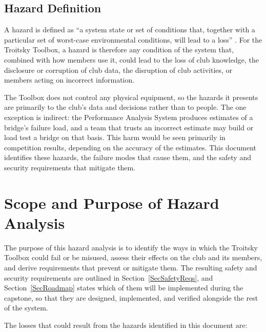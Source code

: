 \documentclass{article}
\begin{document}
\subsection{Hazard Definition}

A hazard is defined as ``a system state or set of conditions that, together
with a particular set of worst-case environmental conditions, will lead to a
loss'' \cite[p.~17]{LevesonAndThomas2018}. For the Troitsky Toolbox, a hazard is therefore any
condition of the system that, combined with how members use it, could lead to
the loss of club knowledge, the disclosure or corruption of club data, the
disruption of club activities, or members acting on incorrect information.

The Toolbox does not control any physical equipment, so the hazards it presents
are primarily to the club's data and decisions rather than to people. The one
exception is indirect: the Performance Analysis System produces estimates of a
bridge's failure load, and a team that trusts an incorrect estimate may build or
load test a bridge on that basis. This harm would be seen primarily in competition results, 
depending on the accuracy of the estimates. This document identifies these hazards, the
failure modes that cause them, and the safety and security requirements that
mitigate them.

\section{Scope and Purpose of Hazard Analysis}

The purpose of this hazard analysis is to identify the ways in which the
Troitsky Toolbox could fail or be misused, assess their effects on the club and
its members, and derive requirements that prevent or mitigate them. The
resulting safety and security requirements are outlined in
Section~\ref{SecSafetyReqs}, and Section~\ref{SecRoadmap} states which of them
will be implemented during the capstone, so that they are designed, implemented, 
and verified alongside the rest of the system.

The losses that could result from the hazards identified in this document are:
\end{document}
